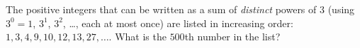 The positive integers that can be written as a sum of \emph{distinct} powers of $3$ (using $3^0=1$, $3^1$, $3^2$, \dots, each at most once) are listed in increasing order: $1,3,4,9,10,12,13,27,\dots$. What is the $500$th number in the list?
